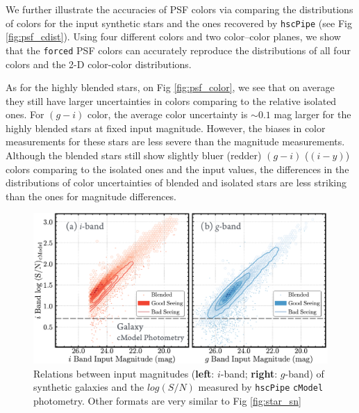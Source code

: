\documentclass[useamsfonts]{pasj01}
\def\hscpipe{\texttt{hscPipe}}
\def\cmodel{\texttt{cModel}}
\def\forced{\texttt{forced}}
\begin{document}
    We further illustrate the accuracies of PSF colors via comparing the distributions
    of colors for the input synthetic stars and the ones recovered by \hscpipe{}
    (see Fig \ref{fig:psf_cdist}).
    Using four different colors and two color--color planes, we show that the \forced{}
    PSF colors can accurately reproduce the distributions of all four colors and the
    2-D color-color distributions.

    As for the highly blended stars, on Fig \ref{fig:psf_color}, we see that on average
    they still have larger uncertainties in colors comparing to the relative isolated
    ones.
    For $(g-i)$ color, the average color uncertainty is ${\sim}0.1$ mag larger for the
    highly blended stars at fixed input magnitude.
    However, the biases in color measurements for these stars are less severe than
    the magnitude measurements.
    Although the blended stars still show slightly bluer (redder) $(g-i)$ ($(i-y)$)
    colors comparing to the isolated ones and the input values, the differences in the
    distributions of color uncertainties of blended and isolated stars are less striking
    than the ones for magnitude differences.


\begin{figure}
    \begin{center}
        \includegraphics[width=\textwidth]{fig/synpipe_galaxy_sn}
    \end{center}
    \caption{
        Relations between input magnitudes (\textbf{left}: $i$-band; \textbf{right}:
        $g$-band) of synthetic galaxies and the $log(S/N)$ measured by \hscpipe{}
        \cmodel{} photometry.
        Other formats are very similar to Fig \ref{fig:star_sn}
        }
    \label{fig:cmodel_sn}
\end{figure}
\end{document}
